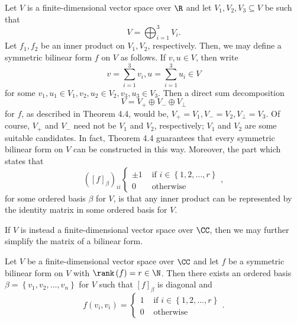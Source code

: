 \documentclass[linearalgebraII]{subfiles}
\begin{document}
    \begin{remark}
        Let $V$ is a finite-dimensional vector space over $\R$ and let $V_1,V_2,V_3\subseteq V$ be such that
        \begin{equation*}
            V = \bigoplus^{3}_{i=1} V_i.
        \end{equation*}
        Let $f_1,f_2$ be an inner product on $V_1,V_2$, respectively. Then, we may define a symmetric bilinear form $f$ on $V$ as follows. If $v,u\in V$, then write
        \begin{equation*}
            v = \sum^{3}_{i=1} v_i, u = \sum^{3}_{i=1} u_i\in V
        \end{equation*}
        for some $v_1,u_1\in V_1, v_2,u_2\in V_2, v_3,u_3\in V_3$. Then a direct sum decomposition
        \begin{equation*}
            V = V_+\oplus V_-\oplus V_\perp
        \end{equation*}
        for $f$, as described in Theorem 4.4, would be, $V_+ = V_1, V_- = V_2, V_\perp = V_3$. Of course, $V_+$ and $V_-$ need not be $V_1$ and $V_2$, respectively; $V_1$ and $V_2$ are some suitable candidates. In fact, Theorem 4.4 guarantees that every symmetric bilinear form on $V$ can be constructed in this way. Moreover, the part which states that
        \begin{equation*}
            \left( \left[ f \right] _\beta \right) _{ii} 
            \begin{cases} 
                \pm 1 & \text{ if } i\in\left\lbrace 1,2,\ldots,r \right\rbrace \\ 
                0 & \text{ otherwise }
            \end{cases},
        \end{equation*}
        for some ordered basis $\beta$ for $V$, is that any inner product can be represented by the identity matrix in some ordered basis for $V$.
    \end{remark}

    \begin{remark}
        If $V$ is instead a finite-dimensional vector space over $\CC$, then we may further simplify the matrix of a bilinear form.
    \end{remark}

    \begin{cor}{}
        Let $V$ be a finite-dimensional vector space over $\CC$ and let $f$ be a symmetric bilinear form on $V$ with $\rank\left( f \right) = r\in\N$. Then there exists an ordered basis $\beta = \left\lbrace v_1,v_2,\ldots,v_n \right\rbrace$ for $V$ such that $\left[ f \right] _\beta$ is diagonal and
        \begin{equation*}
            f\left( v_i,v_i \right) = 
            \begin{cases} 
                1 & \text{ if } i\in\left\lbrace 1,2,\ldots,r \right\rbrace \\ 
                0 & \text{ otherwise }
            \end{cases}.
        \end{equation*}
    \end{cor}	
    
\end{document}
